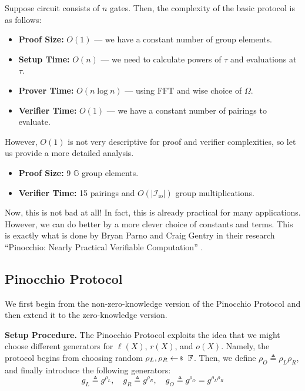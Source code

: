 \documentclass[../lecture-notes-148x210.tex]{subfiles}
\begin{document}
\begin{proposition}
    Suppose circuit consists of $n$ gates. Then, the complexity of the basic protocol is as follows:
    \begin{itemize}
        \item \textbf{Proof Size:} $O(1)$ --- we have a constant number of group elements.
        \item \textbf{Setup Time:} $O(n)$ --- we need to calculate powers of $\tau$ and evaluations at $\tau$.
        \item \textbf{Prover Time:} $O(n \log n)$ --- using FFT and wise choice of $\Omega$.
        \item \textbf{Verifier Time:} $O(1)$ --- we have a constant number of pairings to evaluate.
    \end{itemize}

    However, $O(1)$ is not very descriptive for proof and verifier complexities, so let us provide a more detailed analysis. 
    \begin{itemize}
        \item \textbf{Proof Size:} 9 $\mathbb{G}$ group elements.
        \item \textbf{Verifier Time:} 15 pairings and $O(|\mathcal{I}_{\text{io}}|)$ group multiplications.
    \end{itemize}
\end{proposition}

Now, this is not bad at all! In fact, this is already practical for many applications. However, we can do better by a more clever choice of constants and terms. This is exactly what is done by Bryan Parno and Craig Gentry in their research ``Pinocchio: Nearly Practical Verifiable Computation'' \cite{pinocchio}.

\subsection{Pinocchio Protocol}

We first begin from the non-zero-knowledge version of the Pinocchio Protocol and then extend it to the zero-knowledge version.

\textcolor{blue!75!gray}{\textbf{Setup Procedure.}} The Pinocchio Protocol exploits the idea that we might 
choose different generators for $\ell(X)$, $r(X)$, and $o(X)$. 
Namely, the protocol begins from choosing random $\rho_L,\rho_R \leftarrowS \mathbb{F}$. 
Then, we define $\rho_O \triangleq \rho_L\rho_R$, and finally introduce the following generators:
\begin{equation*}
    g_L \triangleq g^{\rho_L}, \quad g_R \triangleq g^{\rho_R}, \quad g_O \triangleq g^{\rho_O} = g^{\rho_L\rho_R}
\end{equation*}
\end{document}
